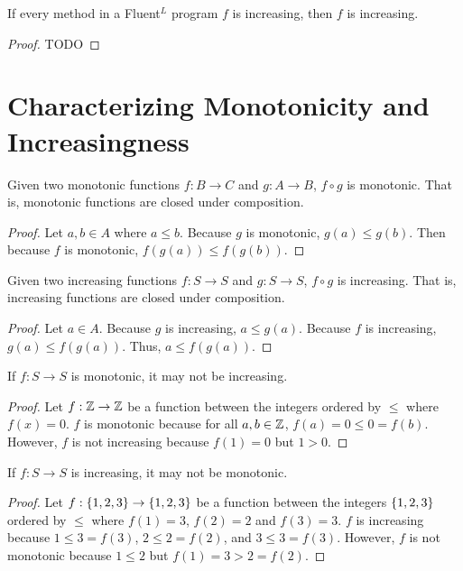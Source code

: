 \documentclass{mwhittaker}
\newcommand{\fluentl}{Fluent$^L$}
\begin{document}
\begin{claim}
  If every method in a \fluentl{} program $f$ is increasing, then $f$ is
  increasing.
\end{claim}
\begin{proof}
  TODO
\end{proof}

\appendix
\section{Characterizing Monotonicity and Increasingness}\label{sec:proofs}
\begin{claim}\label{clm:monotonic-closed}
  Given two monotonic functions $f: B \to C$ and $g: A \to B$, $f \circ g$ is
  monotonic. That is, monotonic functions are closed under composition.
\end{claim}
\begin{proof}
  Let $a, b \in A$ where $a \leq b$. Because $g$ is monotonic, $g(a) \leq
  g(b)$. Then because $f$ is monotonic, $f(g(a)) \leq f(g(b))$.
\end{proof}

\begin{claim}\label{clm:increasing-closed}
  Given two increasing functions $f: S \to S$ and $g: S \to S$, $f \circ g$ is
  increasing. That is, increasing functions are closed under composition.
\end{claim}
\begin{proof}
  Let $a \in A$. Because $g$ is increasing, $a \leq g(a)$. Because $f$ is
  increasing, $g(a) \leq f(g(a))$. Thus, $a \leq f(g(a))$.
\end{proof}

\begin{claim}\label{clm:monotonic-to-increasing}
  If $f: S \to S$ is monotonic, it may not be increasing.
\end{claim}
\begin{proof}
  Let $f: \mathbb{Z} \to \mathbb{Z}$ be a function between the integers ordered by $\leq$
  where $f(x) = 0$. $f$ is monotonic because for all $a, b \in \mathbb{Z}$, $f(a) =
  0 \leq 0 = f(b)$. However, $f$ is not increasing because $f(1) = 0$ but $1 >
  0$.
\end{proof}

\begin{claim}\label{clm:increasing-to-monotonic}
  If $f: S \to S$ is increasing, it may not be monotonic.
\end{claim}
\begin{proof}
  Let $f: \{1,2,3\} \to \{1,2,3\}$ be a function between the integers
  $\{1, 2, 3\}$ ordered by $\leq$ where $f(1) = 3$, $f(2) = 2$ and $f(3) =
  3$. $f$ is increasing because $1 \leq 3 = f(3)$, $2 \leq 2 = f(2)$, and $3
  \leq 3 = f(3)$. However, $f$ is not monotonic because $1 \leq 2$ but $f(1) =
  3 > 2 = f(2)$.
\end{proof}
\end{document}
